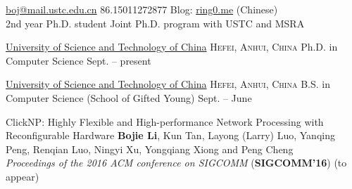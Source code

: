 \documentclass[10pt,a4paper]{article}
\begin{document}
\sloppy  %



\nobreakvspace{0.3em}  %

\noindent\href{mailto:boj@mail.ustc.edu.cn}{boj\mbox{}@\mbox{}mail.ustc.edu.cn}\sbull
\textsmaller{+}86.15011272877\sbull
Blog: \href{https://ring0.me/}{ring0.me} (Chinese)
\\
\noindent 2nd year Ph.D. student\sbull
Joint Ph.D. program with USTC and MSRA


\spacedhrule{0.8em}{-0.8em}  %


\headedsection  %
{\href{http://ustc.edu.cn}{University of Science and Technology of China}}
{\textsc{Hefei, Anhui, China}} {%
	\headedsubsection
	{Ph.D. in Computer Science}
	{Sept.  -- present}
	{}
}

\headedsection  %
{\href{http://ustc.edu.cn}{University of Science and Technology of China}}
{\textsc{Hefei, Anhui, China}} {%
	\headedsubsection
	{B.S. in Computer Science (School of Gifted Young)}
	{Sept.  -- June }
	{}
}

\spacedhrule{0.5em}{-0.8em}



\spacedhrule{1.0em}{-0.8em}


\inlineheadsection
{ClickNP: Highly Flexible and High-performance Network Processing with Reconfigurable Hardware}
{\textbf{Bojie Li}, Kun Tan, Layong (Larry) Luo, Yanqing Peng, Renqian Luo, Ningyi Xu, Yongqiang Xiong and Peng Cheng \\
\textit{Proceedings of the 2016 ACM conference on SIGCOMM} (\textbf{SIGCOMM'16}) (to appear)
}
\end{document}
